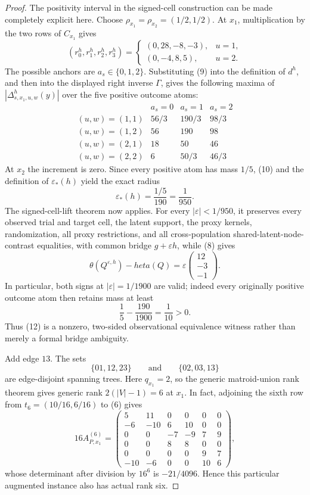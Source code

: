 \documentclass{article}
\begin{document}
\begin{proof}
The positivity interval in the signed-cell construction can be made completely explicit here.  Choose \(\rho_{x_1}=\rho_{x_2}=(1/2,1/2)\).  At \(x_1\), multiplication by the two rows of \(C_{x_1}\) gives
\[
(r^h_0,r^h_1,r^h_2,r^h_3)
=\begin{cases}
(0,28,-8,-3),&u=1,\\
(0,-4,8,5),&u=2.
\end{cases}
\tag{9}
\]
The possible anchors are \(a_s\in\{0,1,2\}\).  Substituting (9) into the definition of \(d^h\), and then into the displayed right inverse \(\Gamma\), gives the following maxima of \(|\Delta^h_{s,x_1,u,w}(y)|\) over the five positive outcome atoms:
\[
\begin{array}{c|ccc}
&a_s=0&a_s=1&a_s=2\\ \hline
(u,w)=(1,1)&56/3&190/3&98/3\\
(u,w)=(1,2)&56&190&98\\
(u,w)=(2,1)&18&50&46\\
(u,w)=(2,2)&6&50/3&46/3
\end{array}
\tag{10}
\]
At \(x_2\) the increment is zero.  Since every positive atom has mass \(1/5\), (10) and the definition of \(\varepsilon_*(h)\) yield the exact radius
\[
\varepsilon_*(h)=\frac{1/5}{190}=\frac1{950}.
\tag{11}
\]
The signed-cell-lift theorem now applies.  For every \(|\varepsilon|<1/950\), it preserves every observed trial and target cell, the latent support, the proxy kernels, randomization, all proxy restrictions, and all cross-population shared-latent-node-contrast equalities, with common bridge \(g+\varepsilon h\), while (8) gives
\[
\theta(Q^{\varepsilon,h})-  heta(Q)
=\varepsilon\begin{pmatrix}12\\-3\\-1\end{pmatrix}.
\tag{12}
\]
In particular, both signs at \(|\varepsilon|=1/1900\) are valid; indeed every originally positive outcome atom then retains mass at least
\[
\frac15-\frac{190}{1900}=\frac1{10}>0.
\]
Thus (12) is a nonzero, two-sided observational equivalence witness rather than merely a formal bridge ambiguity.

Add edge \(13\).  The sets
\[
\{01,12,23\}\qquad\text{and}\qquad\{02,03,13\}
\]
are edge-disjoint spanning trees.  Here \(q_{x_1}=2\), so the generic matroid-union rank theorem gives generic rank \(2(|V|-1)=6\) at \(x_1\).  In fact, adjoining the sixth row from \(t_6=(10/16,6/16)\) to (6) gives
\[
16A_{P,x_1}^{(6)}=
\begin{pmatrix}
5&11&0&0&0&0\\
-6&-10&6&10&0&0\\
0&0&-7&-9&7&9\\
0&0&8&8&0&0\\
0&0&0&0&9&7\\
-10&-6&0&0&10&6
\end{pmatrix},
\]
whose determinant after division by \(16^6\) is \(-21/4096\).  Hence this particular augmented instance also has actual rank six.


\end{proof}
\end{document}
